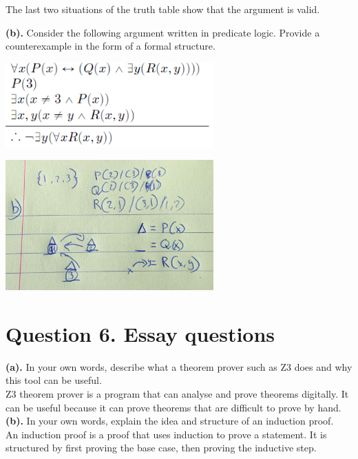 \documentclass[a4paper]{article}
\begin{document}
The last two situations of the truth table show that the argument is valid.\\

\newpage

\textbf{(b).} Consider the following argument written in predicate logic. Provide a counterexample in the form of a formal structure.\\
\begin{center}
    \includegraphics[width=0.6\textwidth]{images/5b.png}\\[1cm]
\end{center}

\begin{center}
    \includegraphics[width=0.6\textwidth]{images/5ba.jpeg}\\[1cm]
\end{center}

\newpage

\section{Question 6. Essay questions}
\textbf{(a).} In your own words, describe what a theorem prover such as Z3 does and why this tool can be useful.\\
Z3 theorem prover is a program that can analyse and prove theorems digitally. It can be useful because it can prove theorems that are difficult to prove by hand.\\

\textbf{(b).} In your own words, explain the idea and structure of an induction proof.\\
An induction proof is a proof that uses induction to prove a statement. It is structured by first proving the base case, then proving the inductive step.\\
\end{document}
